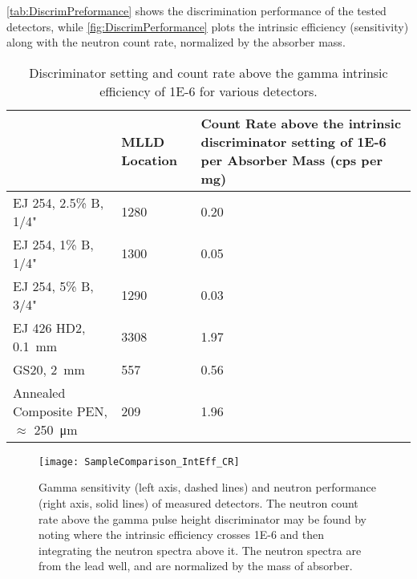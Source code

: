\documentclass[onecolumn]{IEEEtran}
\begin{document}
\autoref{tab:DiscrimPreformance} shows the discrimination performance of the tested detectors, while \autoref{fig:DiscrimPerformance} plots the intrinsic efficiency (sensitivity) along with the neutron count rate, normalized by the absorber mass.
\begin{table}
  \centering
  \caption[Discrimination Performance]{Discriminator setting and count rate above the gamma intrinsic efficiency of \num{1E-6} for various detectors.}
  \label{tab:DiscrimPreformance}
  \begin{tabular}{m{4cm} | m{2cm} m{4cm}}
    \toprule
    &	MLLD Location	&	Count Rate above the intrinsic discriminator setting of \num{1E-6} per Absorber Mass (cps per mg)	\\
    \midrule
    EJ 254, 2.5\% B, 1/4"	&	1280	&	0.20	\\
    EJ 254, 1\% B, 1/4"	&	1300	&	0.05	\\
    EJ 254, 5\% B, 3/4"	&	1290		&	0.03	\\
    EJ 426 HD2, \SI{0.1}{\mm}&	3308		&	1.97	\\
    GS20, \SI{2}{\mm}	&	557		&	0.56	\\
    Annealed Composite PEN, $\approx$ \SI{250}{\um}	&	209	&	1.96	\\
    \bottomrule
\end{tabular}
\end{table}
\begin{figure}
  \centering
  \texttt{[image: SampleComparison\_IntEff\_CR]}
  \caption[Gamma Sensitivity and Neutron Response of Measured Detectors]{Gamma sensitivity (left axis, dashed lines) and neutron performance (right axis, solid lines) of measured detectors.  The neutron count rate above the gamma pulse height discriminator may be found by noting where the intrinsic efficiency crosses \num{1E-6} and then integrating the neutron spectra above it. The neutron spectra are from the lead well, and are normalized by the mass of absorber.}
  \label{fig:DiscrimPerformance}
\end{figure}
\end{document}
